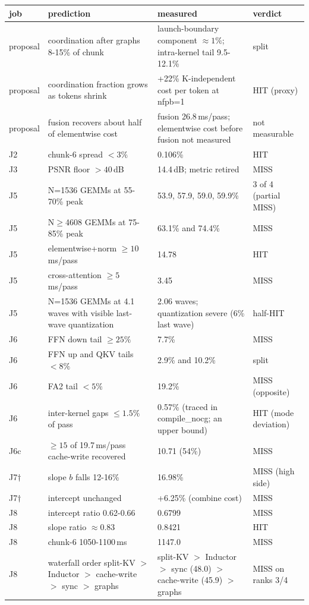 \documentclass[10pt,a4paper]{article}
\begin{document}
\begin{tabularx}{\textwidth}{lYYl}\toprule
job & prediction & measured & verdict\\\midrule
proposal & coordination after graphs 8-15\% of chunk & launch-boundary component $\approx1\%$; intra-kernel tail 9.5-12.1\% & split\\
proposal & coordination fraction grows as tokens shrink & +22\% K-independent cost per token at nfpb=1 & HIT (proxy)\\
proposal & fusion recovers about half of elementwise cost & fusion 26.8\,ms/pass; elementwise cost before fusion not measured & not measurable\\
J2 & chunk-6 spread $<3\%$ & 0.106\% & HIT\\
J3 & PSNR floor $>40$\,dB & 14.4\,dB; metric retired & MISS\\
J5 & N=1536 GEMMs at 55-70\% peak & 53.9, 57.9, 59.0, 59.9\% & 3 of 4 (partial MISS)\\
J5 & N$\ge$4608 GEMMs at 75-85\% peak & 63.1\% and 74.4\% & MISS\\
J5 & elementwise+norm $\ge10$\,ms/pass & 14.78 & HIT\\
J5 & cross-attention $\ge5$\,ms/pass & 3.45 & MISS\\
J5 & N=1536 GEMMs at 4.1 waves with visible last-wave quantization & 2.06 waves; quantization severe (6\% last wave) & half-HIT\\
J6 & FFN down tail $\ge25\%$ & 7.7\% & MISS\\
J6 & FFN up and QKV tails $<8\%$ & 2.9\% and 10.2\% & split\\
J6 & FA2 tail $<5\%$ & 19.2\% & MISS (opposite)\\
J6 & inter-kernel gaps $\le1.5\%$ of pass & 0.57\% (traced in compile\_nocg; an upper bound) & HIT (mode deviation)\\
J6c & $\ge15$ of 19.7\,ms/pass cache-write recovered & 10.71 (54\%) & MISS\\
J7$\dagger$ & slope $b$ falls 12-16\% & 16.98\% & MISS (high side)\\
J7$\dagger$ & intercept unchanged & +6.25\% (combine cost) & MISS\\
J8 & intercept ratio 0.62-0.66 & 0.6799 & MISS\\
J8 & slope ratio $\approx0.83$ & 0.8421 & HIT\\
J8 & chunk-6 1050-1100\,ms & 1147.0 & MISS\\
J8 & waterfall order split-KV $>$ Inductor $>$ cache-write $>$ sync $>$ graphs & split-KV $>$ Inductor $>$ sync (48.0) $>$ cache-write (45.9) $>$ graphs & MISS on ranks 3/4\\

\end{tabularx}
\end{document}
